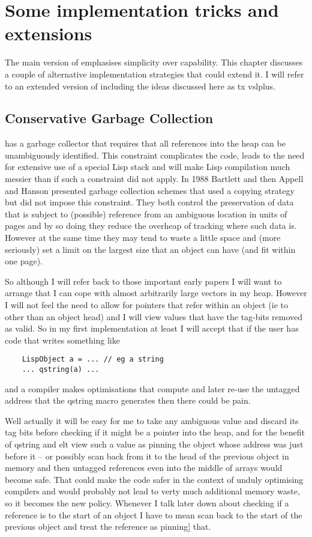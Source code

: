 \chapter{Some implementation tricks and extensions}
The main version of {\vsl} emphasises simplicity over capability.
This chapter discusses a couple of alternative implementation
strategies that could extend it. I will refer to an extended version
of {\vsl} including the ideas discussed here as {tx vslplus}.


\section{Conservative Garbage Collection}
{\vsl} has a garbage collector that requires
that all references into the heap can be unambiguously identified. This
constraint complicates the code, leads to the need for extensive use of
a special Lisp stack and will make Lisp compilation much messier than
if such a constraint did not apply. In 1988 Bartlett\cite{conservative}
and then Appell and Hanson\cite{conservative1} presented garbage
collection schemes that used a copying strategy but did not impose this
constraint. They both control the preservation of data that is subject to
(possible) reference from an ambiguous location in units of pages and by
so doing they reduce the overheap of tracking where such data is.
However at the same time they may tend to waste a little space and
(more seriously) set a limit on the largest size that an object can
have (and fit within one page).

So although I will refer back to those important early papers I will want
to arrange that I can cope with almost arbitrarily large vectors in my
heap. However I will not feel the need to allow for pointers that
refer within an object (ie to other than an object head) and I will view
values that have the {\vsl} tag-bits removed as valid. So in my first
implementation at least I will accept that if the user has code that
writes something like
{\small\begin{verbatim}
    LispObject a = ... // eg a string
    ... qstring(a) ...
\end{verbatim}}
and a compiler makes optimisations that compute and later re-use the
untagged address that the {\tx qstring} macro generates then there could
be pain.

Well actually it will be easy for me to take any ambiguous
value and discard its tag bits before checking if it might be a
pointer into the heap, and for the benefit of {\tx qstring} and
{\tx elt} view such a value as pinning the object whose address was
just before it -- or possibly scan back from it to the head of the
previous object in memory and then untagged references even into the
middle of arrays would become safe. That could make the code
safer in the context of unduly optimising compilers and would
probably not lead to verty much additional memory waste, so it
becomes the new policy. Whenever I talk later down about checking if
a reference is to the start of an object I have to mean scan back
to the start of the previous object and treat the reference as pinning]
that.

